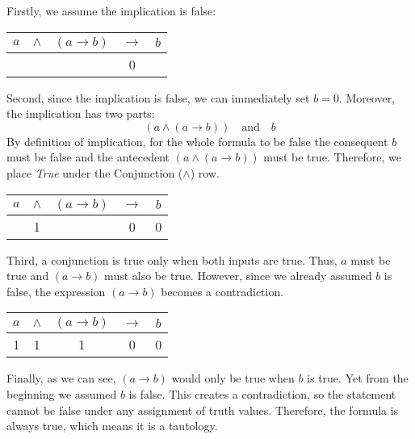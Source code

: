 \documentclass[12pt,a4paper,openany]{article}
\begin{document}
Firstly, we assume the implication is false:

\begin{center}
\begin{tabular}{|c|c|c|c|c|}
\hline
$a$ & $\land$ & $(a \to b)$ & $\to$ & $b$ \\
\hline
 & & & \textcolor{falsecolor}{0} & \\
\hline
\end{tabular}
\end{center}

Second, since the implication is false, we can immediately set $b = 0$. Moreover, the implication has two parts:
$$ (a \land (a \to b)) \quad \text{and} \quad b $$
By definition of implication, for the whole formula to be false the consequent $b$ must be false and the antecedent $(a \land (a \to b))$ must be true. Therefore, we place \textit{True} under the Conjunction ($\land$) row.

\begin{center}
\begin{tabular}{|c|c|c|c|c|}
\hline
$a$ & $\land$ & $(a \to b)$ & $\to$ & $b$ \\
\hline
 & \textcolor{truecolor}{1} & & \textcolor{falsecolor}{0} & \textcolor{falsecolor}{0} \\
\hline
\end{tabular}
\end{center}

Third, a conjunction is true only when both inputs are true. Thus, $a$ must be true and $(a \to b)$ must also be true. 
However, since we already assumed $b$ is false, the expression $(a \to b)$ becomes a contradiction.

\begin{center}
\begin{tabular}{|c|c|c|c|c|}
\hline
$a$ & $\land$ & $(a \to b)$ & $\to$ & $b$ \\
\hline
\textcolor{truecolor}{1} & \textcolor{truecolor}{1} & \textcolor{truecolor}{1} & \textcolor{falsecolor}{0} & \textcolor{falsecolor}{0} \\
\hline
\end{tabular}
\end{center}

Finally, as we can see, $(a \to b)$ would only be true when $b$ is true. Yet from the beginning we assumed $b$ is false. This creates a contradiction,
so the statement cannot be false under any assignment of truth values. Therefore, the formula is always true, which means it is a tautology.
\end{document}
